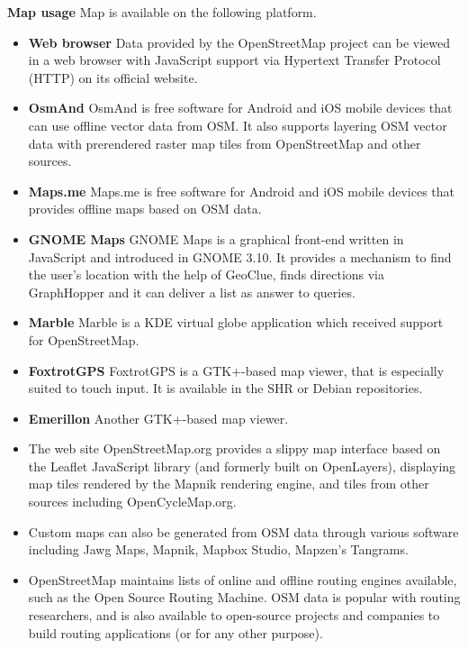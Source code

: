 \textbf{Map usage}
Map is available on the following platform.
\begin{itemize}
\item \textbf{Web browser}
    Data provided by the OpenStreetMap project can be viewed in a web browser with JavaScript support via Hypertext Transfer Protocol (HTTP) on its official website.\\
\item \textbf{OsmAnd}
    OsmAnd is free software for Android and iOS mobile devices that can use offline vector data from OSM. It also supports layering OSM vector data with prerendered raster map tiles from OpenStreetMap and other sources.\\
\item \textbf{Maps.me}
    Maps.me is free software for Android and iOS mobile devices that provides offline maps based on OSM data.\\
\item \textbf{GNOME Maps}
    GNOME Maps is a graphical front-end written in JavaScript and introduced in GNOME 3.10. It provides a mechanism to find the user's location with the help of GeoClue, finds directions via GraphHopper and it can deliver a list as answer to queries.\\
\item \textbf{Marble}
    Marble is a KDE virtual globe application which received support for OpenStreetMap.\\
\item \textbf{FoxtrotGPS}
    FoxtrotGPS is a GTK+-based map viewer, that is especially suited to touch input. It is available in the SHR or Debian repositories.\\
\item \textbf{Emerillon}
    Another GTK+-based map viewer.\\

\item The web site OpenStreetMap.org provides a slippy map interface based on the Leaflet JavaScript library (and formerly built on OpenLayers), displaying map tiles rendered by the Mapnik rendering engine, and tiles from other sources including OpenCycleMap.org.\\

\item Custom maps can also be generated from OSM data through various software including Jawg Maps, Mapnik, Mapbox Studio, Mapzen's Tangrams.\\

\item OpenStreetMap maintains lists of online and offline routing engines available, such as the Open Source Routing Machine. OSM data is popular with routing researchers, and is also available to open-source projects and companies to build routing applications (or for any other purpose).\\
\end{itemize}

